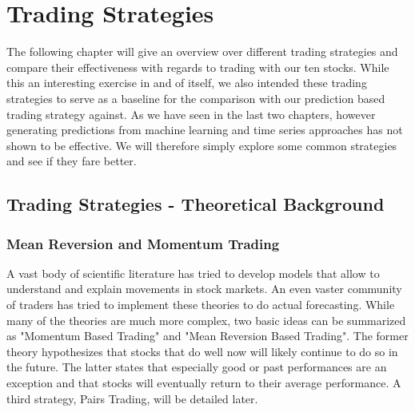 \chapter{Trading Strategies}\label{ch:strategies}
The following chapter will give an overview over different trading strategies and compare their effectiveness with regards to trading with our ten stocks. While this an interesting exercise in and of itself, we also intended these trading strategies to serve as a baseline for the comparison with our prediction based trading strategy against. As we have seen in the last two chapters, however generating predictions from machine learning and time series approaches has not shown to be effective. We will therefore simply explore some common strategies and see if they fare better. 


\section{Trading Strategies - Theoretical Background}

\subsection{Mean Reversion and Momentum Trading}
A vast body of scientific literature has tried to develop models that allow to understand and explain movements in stock markets. An even vaster community of traders has tried to implement these theories to do actual forecasting. While many of the theories are much more complex, two basic ideas can be summarized as "Momentum Based Trading" and "Mean Reversion Based Trading". The former theory hypothesizes that stocks that do well now will likely continue to do so in the future. The latter states that especially good or past performances are an exception and that stocks will eventually return to their average performance. A third strategy, Pairs Trading, will be detailed later. 

